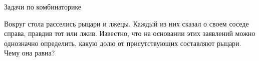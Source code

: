 \documentclass[11pt, a4paper]{common/document_template}
\begin{document}
\begin{titlepage}
  \begin{center}
	\Huge{Задачи по комбинаторике}
  \end{center}
\end{titlepage}

\begin{exercise}
Вокруг стола расселись рыцари и лжецы. Каждый из них сказал о своем соседе справа, правдив тот или лжив. Известно, что на основании этих заявлений можно однозначно определить, какую долю от присутствующих составляют рыцари. Чему она равна?
\end{exercise}
\end{document}
